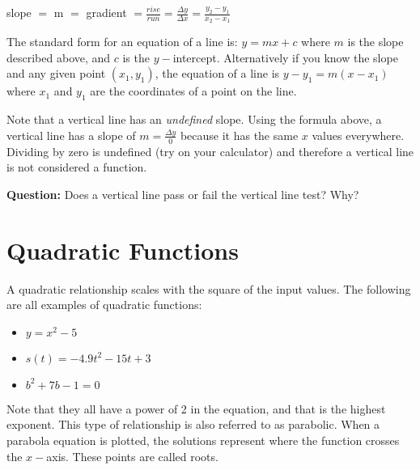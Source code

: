 \begin{tcolorbox}
	\begin{center}
	slope $=$ m $=$ gradient $=\frac{rise}{run}=\frac{\Delta y}{\Delta x}=\frac{y_{2} -y_{1}}{x_{2} -x_{1}}$
\end{center}\end{tcolorbox}	

 
 The standard form for an equation of a line is: $y =m x +c$ where $m$ is the slope described above, and $c$ is the $y-$intercept. Alternatively if you know the slope and any given point $(x_1,y_1)$, the equation of a line is $y -y_{1} =m (x -x_{1})$ where $x_1$ and $y_1$ are the coordinates of a point on the line.

Note that a vertical line has an \textit{undefined} slope. Using the formula above, a vertical line has a slope of $m=\frac{\Delta y}{0}$ because it has the same $x$ values everywhere. Dividing by zero is undefined (try on your calculator) and therefore a vertical line is not considered a function.

\textbf{Question:} Does a vertical line pass or fail the vertical line test? Why?

\section*{Quadratic Functions}
 A quadratic relationship scales with the square of the input values. The following are all examples of quadratic functions:
 \begin{itemize}
 	\item $ y=x^2-5$
 	\item $ s(t)=-4.9t^2-15t+3$
 	\item $ b^2+7b-1=0$
 \end{itemize}
Note that they all have a power of 2 in the equation, and that is the highest exponent. This type of relationship is also referred to as parabolic. When a parabola equation is plotted, the solutions represent where the function crosses the $x-$axis. These points are called roots.
 
